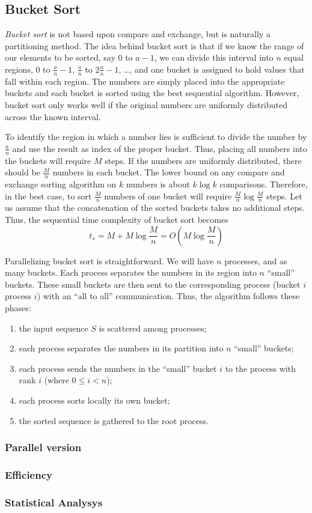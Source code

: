 \subsection{Bucket Sort}
\textit{Bucket sort} is not based upon compare and exchange, but is naturally a partitioning method. The idea behind bucket sort is that if we know the range of our elements to be sorted, say $0$ to $a-1$, we can divide this interval into $n$ equal regions, $0$ to $\frac{a}{n}-1$, $\frac{a}{n}$ to $2\frac{a}{n}-1$, \dots , and one bucket is assigned to hold values that fall within each region. The numbers are simply placed into the appropriate buckets and each bucket is sorted using the best sequential algorithm. However, bucket sort only works well if the original numbers are uniformly distributed across the known interval. 

To identify the region in which a number lies is sufficient to divide the number by $\frac{a}{n}$ and use the result as index of the proper bucket. Thus, placing all numbers into the buckets will require $M$ steps. If the numbers are uniformly distributed, there should be $\frac{M}{n}$ numbers in each bucket. The lower bound on any compare and exchange sorting algorithm on $k$ numbers is about $k \log k$ comparisons. Therefore, in the best case, to sort $\frac{M}{n}$ numbers of one bucket will require $\frac{M}{n} \log \frac{M}{n}$ steps. Let us assume that the concatenation of the sorted buckets takes no additional steps. Thus, the sequential time complexity of bucket sort becomes
\[
t_s = M + M \log \frac{M}{n} = O( M \log \frac{M}{n} )
\]

Parallelizing bucket sort is straightforward. We will have $n$ processes, and as many buckets. Each process separates the numbers in its region into $n$ ``small'' buckets. These small buckets are then sent to the corresponding process (bucket $i$ process $i$) with an ``all to all'' communication. Thus, the algorithm follows these phases:
\begin{enumerate}	
	\item the input sequence $S$ is scattered among processes;
	\item each process separates the numbers in its partition into $n$ ``small'' buckets;
	\item each process sends the numbers in the ``small'' bucket $i$ to the process with rank $i$ (where $0 \leq i < n$);
	\item each process sorts locally its own bucket;
	\item the sorted sequence is gathered to the root process.
\end{enumerate}

 
\subsubsection*{Parallel version} 
\subsubsection*{Efficiency} 
\subsubsection*{Statistical Analysys}